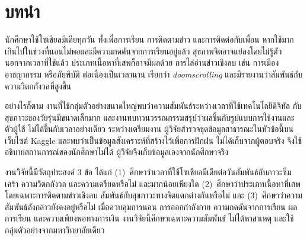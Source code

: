 \section{บทนำ}

นักศึกษาใช้โซเชียลมีเดียทุกวัน ทั้งเพื่อการเรียน การติดตามข่าว และการติดต่อกับเพื่อน
หากใช้มากเกินไปในช่วงที่นอนไม่พอและมีความกดดันจากการเรียนอยู่แล้ว สุขภาพจิตอาจแย่ลงโดยไม่รู้ตัว
นอกจากเวลาที่ใช้แล้ว ประเภทเนื้อหาที่เสพก็อาจมีผลด้วย
การไล่อ่านข่าวเชิงลบ เช่น การเมือง อาชญากรรม หรือภัยพิบัติ ต่อเนื่องเป็นเวลานาน
เรียกว่า \textit{doomscrolling} และมีรายงานว่าสัมพันธ์กับความวิตกกังวลที่สูงขึ้น
\cite{dominguez2025climate}

อย่างไรก็ตาม งานที่ใช้กลุ่มตัวอย่างขนาดใหญ่พบว่าความสัมพันธ์ระหว่างเวลาที่ใช้เทคโนโลยีดิจิทัล
กับสุขภาวะของวัยรุ่นมีขนาดเล็กมาก \cite{orben2019association}
และงานทบทวนวรรณกรรมสรุปว่าผลขึ้นกับรูปแบบการใช้งานและตัวผู้ใช้ ไม่ได้ขึ้นกับเวลาอย่างเดียว
\cite{sala2024umbrella}
ระหว่างเตรียมงาน ผู้วิจัยสำรวจชุดข้อมูลสาธารณะในหัวข้อนี้บนเว็บไซต์ Kaggle
\cite{singh_student_social_media,singh_social_media_addiction}
และพบว่าเป็นข้อมูลสังเคราะห์ที่สร้างไว้เพื่อการฝึกฝน ไม่ได้เก็บจากผู้ตอบจริง
จึงใช้อธิบายสถานการณ์ของนักศึกษาไม่ได้ ผู้วิจัยจึงเก็บข้อมูลเองจากนักศึกษาจริง

งานวิจัยนี้มีวัตถุประสงค์ 3 ข้อ ได้แก่
(1)~ศึกษาว่าเวลาที่ใช้โซเชียลมีเดียต่อวันสัมพันธ์กับภาวะซึมเศร้า ความวิตกกังวล และความเครียดหรือไม่
และมากน้อยเพียงใด
(2)~ศึกษาว่าประเภทเนื้อหาที่เสพ โดยเฉพาะการติดตามข่าวเชิงลบ สัมพันธ์กับสุขภาวะทางจิตแตกต่างกันหรือไม่
และ (3)~ศึกษาว่าความสัมพันธ์ดังกล่าวยังคงอยู่หรือไม่ เมื่อควบคุมการนอน การออกกำลังกาย
ความกดดันจากการเรียน ผลการเรียน และความเพียงพอทางการเงิน
งานวิจัยนี้ศึกษาเฉพาะความสัมพันธ์ ไม่ได้หาสาเหตุ และใช้กลุ่มตัวอย่างจากมหาวิทยาลัยเดียว
